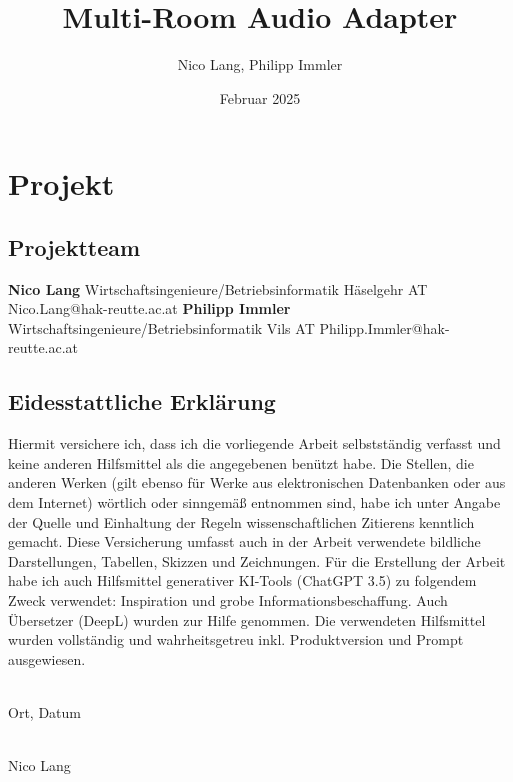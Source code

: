 \documentclass[11pt, twoside]{article}
\title{\textbf{Multi-Room Audio Adapter}}
\author{Nico Lang, Philipp Immler}
\date{Februar 2025}
\begin{document}
\maketitle
{}
\newpage
{}

\section{Projekt}
\subsection{Projektteam}
\textbf{Nico Lang}\newline
Wirtschaftsingenieure/Betriebsinformatik Häselgehr AT\newline
Nico.Lang@hak-reutte.ac.at\newline
\newline
\textbf{Philipp Immler}\newline
Wirtschaftsingenieure/Betriebsinformatik Vils AT\newline
Philipp.Immler@hak-reutte.ac.at

\newpage

\subsection{Eidesstattliche Erklärung}
Hiermit versichere ich, dass ich die vorliegende Arbeit selbstständig verfasst und keine anderen Hilfsmittel als die angegebenen benützt habe. Die Stellen, die anderen Werken (gilt ebenso für Werke aus elektronischen Datenbanken oder aus dem Internet) wörtlich oder sinngemäß entnommen sind, habe ich unter Angabe der Quelle und Einhaltung der Regeln wissenschaftlichen Zitierens kenntlich gemacht. Diese Versicherung umfasst auch in der Arbeit verwendete bildliche Darstellungen, Tabellen, Skizzen und Zeichnungen. Für die Erstellung der Arbeit habe ich auch Hilfsmittel generativer KI-Tools (ChatGPT 3.5) zu folgendem Zweck verwendet: Inspiration und grobe Informationsbeschaffung. Auch Übersetzer (DeepL) wurden zur Hilfe genommen. Die verwendeten Hilfsmittel wurden vollständig und wahrheitsgetreu inkl. Produktversion und Prompt ausgewiesen.\\

\vspace{30mm}

\noindent
\begin{minipage}[c]{5cm}
	\centering \dotfill \\
	Ort, Datum
\end{minipage}
\hfill
    \begin{minipage}[c]{5cm}
        \centering \dotfill \\
        Nico Lang
    \end{minipage}
    
\end{document}
